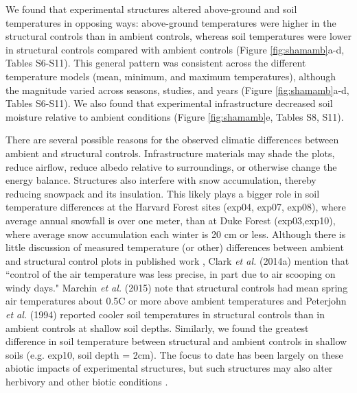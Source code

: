 \documentclass{article}
\begin{document}
\par We found that experimental structures altered above-ground and soil temperatures in opposing ways: above-ground temperatures were higher in the structural controls than in ambient controls, whereas soil temperatures were lower in structural controls compared with ambient controls (Figure \ref{fig:shamamb}a-d, Tables S6-S11). This general pattern was consistent across the different temperature models (mean, minimum, and maximum temperatures), although the magnitude varied across seasons, studies, and years (Figure \ref{fig:shamamb}a-d, Tables S6-S11). We also found that experimental infrastructure decreased soil moisture relative to ambient conditions (Figure \ref{fig:shamamb}e, Tables S8, S11). 

\par There are several possible reasons for the observed climatic differences between ambient and structural controls. Infrastructure materials may shade the plots, reduce airflow, reduce albedo relative to surroundings, or otherwise change the energy balance. Structures also interfere with snow accumulation, thereby reducing snowpack and its insulation. %
This likely plays a bigger role in soil temperature differences at the Harvard Forest sites (exp04, exp07, exp08), where average annual snowfall is over one meter, than at Duke Forest (exp03,exp10), where average snow accumulation each winter is 20 cm or less. Although there is little discussion of measured temperature (or other) differences between ambient and structural control plots in published work \citep[e.g.,][]{farnsworth1995,pelini2011,clark2014a,clark2014b}, Clark \textit{et al.} (2014a) mention that ``control of the air temperature was less precise, in part due to air scooping on windy days." Marchin \textit{et al.} (2015) note that structural controls had mean spring air temperatures about  0.5\degree C or more above ambient temperatures and Peterjohn \textit{et al.} (1994) reported cooler soil temperatures in structural controls than in ambient controls at shallow soil depths. Similarly, we found the greatest difference in soil temperature between structural and ambient controls in shallow soils (e.g. exp10, soil depth = 2cm). The focus to date has been largely on these abiotic impacts of experimental structures, but such structures may also alter herbivory and other biotic conditions \citep{kennedy1995,moise2010,wolkovich2012,hoeppner2012}. 
\end{document}
